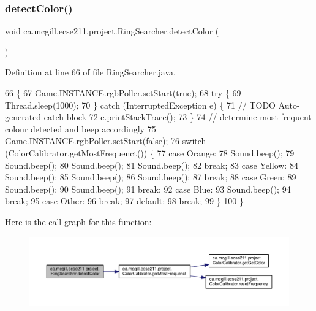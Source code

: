 \subsubsection{\texorpdfstring{detect\+Color()}{detectColor()}}
{\footnotesize\ttfamily void ca.\+mcgill.\+ecse211.\+project.\+Ring\+Searcher.\+detect\+Color (\begin{DoxyParamCaption}{ }\end{DoxyParamCaption})}



Definition at line 66 of file Ring\+Searcher.\+java.


\begin{DoxyCode}
66                             \{
67     Game.INSTANCE.rgbPoller.setStart(\textcolor{keyword}{true});
68     \textcolor{keywordflow}{try} \{
69       Thread.sleep(1000);
70     \} \textcolor{keywordflow}{catch} (InterruptedException e) \{
71       \textcolor{comment}{// TODO Auto-generated catch block}
72       e.printStackTrace();
73     \}
74     \textcolor{comment}{// determine most frequent colour detected and beep accordingly}
75     Game.INSTANCE.rgbPoller.setStart(\textcolor{keyword}{false});
76     \textcolor{keywordflow}{switch} (ColorCalibrator.getMostFrequenct()) \{
77       \textcolor{keywordflow}{case} Orange:
78         Sound.beep();
79         Sound.beep();
80         Sound.beep();
81         Sound.beep();
82         \textcolor{keywordflow}{break};
83       \textcolor{keywordflow}{case} Yellow:
84         Sound.beep();
85         Sound.beep();
86         Sound.beep();
87         \textcolor{keywordflow}{break};
88       \textcolor{keywordflow}{case} Green:
89         Sound.beep();
90         Sound.beep();
91         \textcolor{keywordflow}{break};
92       \textcolor{keywordflow}{case} Blue:
93         Sound.beep();
94         \textcolor{keywordflow}{break};
95       \textcolor{keywordflow}{case} Other:
96         \textcolor{keywordflow}{break};
97       \textcolor{keywordflow}{default}:
98         \textcolor{keywordflow}{break};
99     \}
100   \}
\end{DoxyCode}
Here is the call graph for this function\+:
\nopagebreak
\begin{figure}[H]
\begin{center}
\leavevmode
\includegraphics[width=350pt]{classca_1_1mcgill_1_1ecse211_1_1project_1_1_ring_searcher_a997bf874ae5577c48719254677830fb7_cgraph}
\end{center}
\end{figure}
